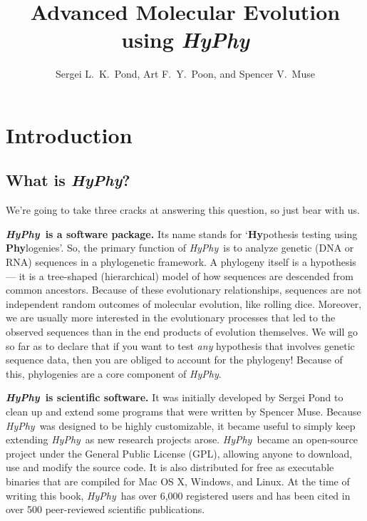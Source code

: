 \documentclass[12pt]{book}
\newcommand{\hyphy}{\textit{HyPhy}}
\begin{document}
\title{Advanced Molecular Evolution using {\it HyPhy}}
\author{Sergei L.~K.~Pond, Art F.~Y.~Poon, and Spencer V.~Muse}
\date{}
\maketitle

\chapter {Introduction}

\section {What is \hyphy?}

We're going to take three cracks at answering this question, so just bear with us.

\textbf{\hyphy\ is a software package.}  Its name stands for `{\bf Hy}pothesis testing using {\bf Phy}logenies'.  So, the primary function of \hyphy\ is to analyze genetic (DNA or RNA) sequences in a phylogenetic framework.  A phylogeny itself is a hypothesis --- it is a tree-shaped (hierarchical) model of how sequences are descended from common ancestors.  Because of these evolutionary relationships, sequences are not independent random outcomes of molecular evolution, like rolling dice.  
Moreover, we are usually more interested in the evolutionary processes that led to the observed sequences than in the end products of evolution themselves.  We will go so far as to declare that if you want to test {\it any} hypothesis that involves genetic sequence data, then you are obliged to account for the phylogeny!  Because of this, phylogenies are a core component of {\it HyPhy}.

\textbf{\hyphy\ is scientific software.}  It was initially developed by Sergei Pond to clean up and extend some programs that were written by Spencer Muse.  Because \hyphy\ was designed to be highly customizable, it became useful to simply keep extending \hyphy\ as new research projects arose.  \hyphy\ became an open-source project under the General Public License (GPL), allowing anyone to download, use and modify the source code.  It is also distributed for free as executable binaries that are compiled for Mac OS X, Windows, and Linux.  At the time of writing this book, \hyphy\ has over 6,000 registered users and has been cited in over 500 peer-reviewed scientific publications.  
\end{document}

